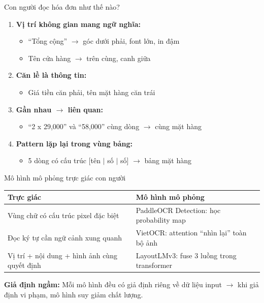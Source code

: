 \documentclass[aspectratio=169]{beamer}
\begin{document}
\begin{frame}{Con người đọc hóa đơn như thế nào?}
    \begin{enumerate}
        \item \textbf{Vị trí không gian mang ngữ nghĩa:}
        \begin{itemize}
            \item ``Tổng cộng'' $\rightarrow$ góc dưới phải, font lớn, in đậm
            \item Tên cửa hàng $\rightarrow$ trên cùng, canh giữa
        \end{itemize}
        \item \textbf{Căn lề là thông tin:}
        \begin{itemize}
            \item Giá tiền căn phải, tên mặt hàng căn trái
        \end{itemize}
        \item \textbf{Gần nhau $\rightarrow$ liên quan:}
        \begin{itemize}
            \item ``2 x 29,000'' và ``58,000'' cùng dòng $\rightarrow$ cùng mặt hàng
        \end{itemize}
        \item \textbf{Pattern lặp lại trong vùng bảng:}
        \begin{itemize}
            \item 5 dòng có cấu trúc [tên $|$ số $|$ số] $\rightarrow$ bảng mặt hàng
        \end{itemize}
    \end{enumerate}
\end{frame}

\begin{frame}{Mô hình mô phỏng trực giác con người}
    \begin{center}
    \begin{tabular}{p{3.5cm}p{8cm}}
        \toprule
        \textbf{Trực giác} & \textbf{Mô hình mô phỏng} \\
        \midrule
        Vùng chữ có cấu trúc pixel đặc biệt & PaddleOCR Detection: học probability map \\
        \addlinespace
        Đọc ký tự cần ngữ cảnh xung quanh & VietOCR: attention ``nhìn lại'' toàn bộ ảnh \\
        \addlinespace
        Vị trí + nội dung + hình ảnh cùng quyết định & LayoutLMv3: fuse 3 luồng trong transformer \\
        \bottomrule
    \end{tabular}
    \end{center}
    \vspace{0.5cm}
    \textbf{Giả định ngầm:} Mỗi mô hình đều có giả định riêng về dữ liệu input $\rightarrow$ khi giả định vi phạm, mô hình suy giảm chất lượng.
\end{frame}
\end{document}
